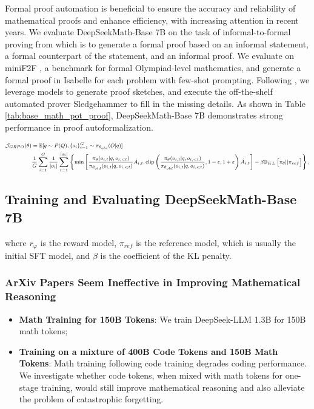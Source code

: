 \begin{itemize}[topsep=0pt]
Formal proof automation is beneficial to ensure the accuracy and reliability of mathematical proofs and enhance efficiency, with increasing attention in recent years. We evaluate DeepSeekMath-Base 7B on the task of informal-to-formal proving from \citep{dsp_proof} which is to generate a formal proof based on an informal statement, a formal counterpart of the statement, and an informal proof. We evaluate on miniF2F \citep{minif2f}, a benchmark for formal Olympiad-level mathematics, and generate a formal proof in Isabelle for each problem with few-shot prompting. Following \cite{dsp_proof}, we leverage models to generate proof sketches, and execute the off-the-shelf automated prover Sledgehammer \citep{sledgehammer} to fill in the missing details. As shown in Table \ref{tab:base_math_pot_proof}, DeepSeekMath-Base 7B demonstrates strong performance in proof autoformalization.

\begin{equation}
\footnotesize
\begin{split}
    \mathcal{J}_{GRPO}(\theta) &= \mathbb{E}{[q \sim P(Q), \{o_i\}_{i=1}^G \sim \pi_{\theta_{old}}(O|q)]}  \\
    & \frac{1}{G}\sum_{i=1}^G\frac{1}{|o_i|} \sum_{t=1}^{|o_i|} \left\{ \min \left[ \frac{\pi_\theta(o_{i,t} | q, o_{i,<t})}{\pi_{\theta_{old}}(o_{i,t} | q, o_{i,<t})} \hat{A}_{i,t}, \text{clip} \left( \frac{\pi_\theta(o_{i,t} | q, o_{i,<t})}{\pi_{\theta_{old}}(o_{i,t} | q, o_{i,<t})}, 1 - \varepsilon, 1 + \varepsilon \right)  \hat{A}_{i,t} \right] - \beta \mathbb{D}_{KL}\left[\pi_{\theta} || \pi_{ref}\right]\right\} ,
\end{split}
\label{eq:GRPO-obj}
\end{equation}

\subsection{Training and Evaluating DeepSeekMath-Base 7B}

where $r_\varphi$  is the reward model, $\pi_{ref}$ is the reference model, which is usually the initial SFT model, and $\beta$  is the coefficient of the KL penalty.

\subsubsection{ArXiv Papers Seem Ineffective in Improving Mathematical Reasoning}

\begin{itemize}[topsep=0pt]
    \item \textbf{Math Training for 150B Tokens}: We train DeepSeek-LLM 1.3B for 150B math tokens;
    \item \textbf{Training on a mixture of 400B Code Tokens and 150B Math Tokens}: Math training following code training degrades coding performance. We investigate whether code tokens, when mixed with math tokens for one-stage training, would still improve mathematical reasoning and also alleviate the problem of catastrophic forgetting.
\end{itemize}


\end{itemize}

